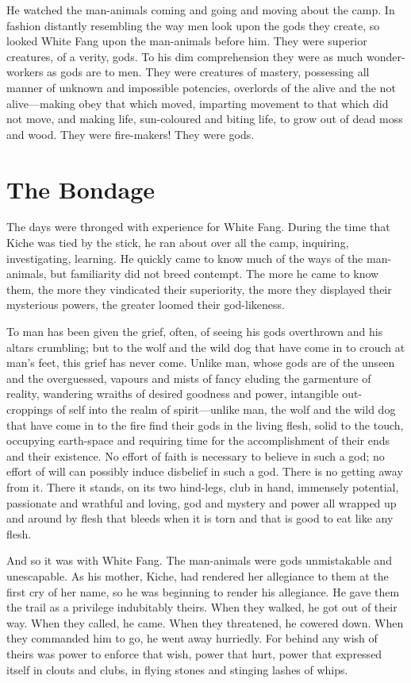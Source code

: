 \documentclass[10pt]{book}
\begin{document}
He watched the man-animals coming and going and moving about the camp.
In fashion distantly resembling the way men look upon the gods they
create, so looked White Fang upon the man-animals before him. They were
superior creatures, of a verity, gods. To his dim comprehension they
were as much wonder-workers as gods are to men. They were creatures of
mastery, possessing all manner of unknown and impossible potencies,
overlords of the alive and the not alive—making obey that which moved,
imparting movement to that which did not move, and making life,
sun-coloured and biting life, to grow out of dead moss and wood. They
were fire-makers! They were gods.

\chapter{The Bondage}

The days were thronged with experience for White Fang. During the time
that Kiche was tied by the stick, he ran about over all the camp,
inquiring, investigating, learning. He quickly came to know much of the
ways of the man-animals, but familiarity did not breed contempt. The
more he came to know them, the more they vindicated their superiority,
the more they displayed their mysterious powers, the greater loomed
their god-likeness.

To man has been given the grief, often, of seeing his gods overthrown
and his altars crumbling; but to the wolf and the wild dog that have
come in to crouch at man’s feet, this grief has never come. Unlike man,
whose gods are of the unseen and the overguessed, vapours and mists of
fancy eluding the garmenture of reality, wandering wraiths of desired
goodness and power, intangible out-croppings of self into the realm of
spirit—unlike man, the wolf and the wild dog that have come in to the
fire find their gods in the living flesh, solid to the touch, occupying
earth-space and requiring time for the accomplishment of their ends and
their existence. No effort of faith is necessary to believe in such a
god; no effort of will can possibly induce disbelief in such a god.
There is no getting away from it. There it stands, on its two
hind-legs, club in hand, immensely potential, passionate and wrathful
and loving, god and mystery and power all wrapped up and around by
flesh that bleeds when it is torn and that is good to eat like any
flesh.

And so it was with White Fang. The man-animals were gods unmistakable
and unescapable. As his mother, Kiche, had rendered her allegiance to
them at the first cry of her name, so he was beginning to render his
allegiance. He gave them the trail as a privilege indubitably theirs.
When they walked, he got out of their way. When they called, he came.
When they threatened, he cowered down. When they commanded him to go,
he went away hurriedly. For behind any wish of theirs was power to
enforce that wish, power that hurt, power that expressed itself in
clouts and clubs, in flying stones and stinging lashes of whips.
\end{document}
